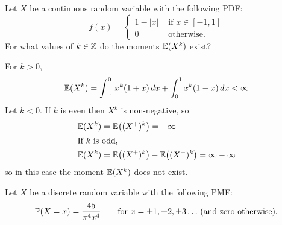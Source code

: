 \begin{exercise}
\begin{questions}
\question
Let $X$ be a continuous random variable with the following PDF:
\[
f(x) = \begin{cases}
	1-|x|	& \text{ if } x\in[-1,1] \\
	0		& \text{ otherwise.}
\end{cases}
\]
For what values of $k\in\mathbb{Z}$ do the moments $\mathbb{E}(X^{k})$ exist?  
\begin{answer}
For $k>0$,
\[
\mathbb{E}(X^{k}) = \int_{-1}^{0}x^{k}(1+x)\,dx + \int_{0}^{1}x^{k}(1-x)\,dx < \infty
\]
Let $k < 0$. If $k$ is even then $X^k$ is non-negative, so
\begin{align*}
\mathbb{E}(X^k)
	& = \mathbb{E}\big((X^{+})^{k}\big) = +\infty\\
\intertext{If $k$ is odd,}
\mathbb{E}(X^k)
	& = \mathbb{E}\big((X^{+})^{k}\big) - \mathbb{E}\big((X^{-})^{k}\big) 
		= \infty - \infty 
\end{align*}
so in this case the moment $\mathbb{E}(X^k)$ does not exist.
\end{answer} 

\question
Let $X$ be a discrete random variable with the following PMF:
\[
\mathbb{P}(X=x) = \frac{45}{\pi^4x^4} \qquad\text{for $x=\pm 1,\pm 2,\pm 3\ldots$ (and zero otherwise).}
\]
\end{questions}
\end{exercise}
